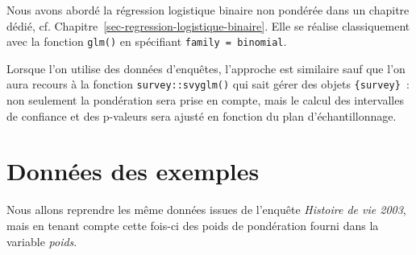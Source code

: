 \documentclass[
  letterpaper,
  DIV=11,
  numbers=noendperiod,
  oneside]{scrreprt}
\begin{document}
Nous avons abordé la régression logistique binaire non pondérée dans un
chapitre dédié, cf. Chapitre~\ref{sec-regression-logistique-binaire}.
Elle se réalise classiquement avec la fonction \texttt{glm()} en
spécifiant \texttt{family\ =\ binomial}.

Lorsque l'on utilise des données d'enquêtes, l'approche est similaire
sauf que l'on aura recours à la fonction \texttt{survey::svyglm()} qui
sait gérer des objets \texttt{\{survey\}}~: non seulement la pondération
sera prise en compte, mais le calcul des intervalles de confiance et des
p-valeurs sera ajusté en fonction du plan d'échantillonnage.

\hypertarget{donnuxe9es-des-exemples}{%
\section{Données des exemples}\label{donnuxe9es-des-exemples}}

Nous allons reprendre les même données issues de l'enquête
\emph{Histoire de vie 2003}, mais en tenant compte cette fois-ci des
poids de pondération fourni dans la variable \emph{poids}.
\end{document}
